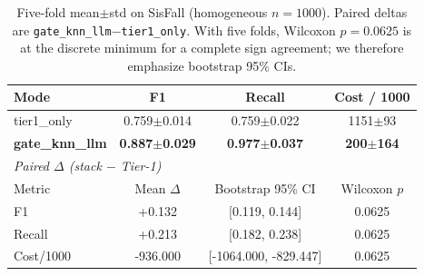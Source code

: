 \begin{table}[!t]
\centering
\caption{Five-fold mean$\pm$std on SisFall (homogeneous $n{=}1000$). Paired deltas are \texttt{gate\_knn\_llm}$-$\texttt{tier1\_only}. With five folds, Wilcoxon $p{=}0.0625$ is at the discrete minimum for a complete sign agreement; we therefore emphasize bootstrap 95\% CIs.}
\label{tab:meanstd}
\begin{tabular}{lccc}
\toprule
Mode & F1 & Recall & Cost / 1000 \\
\midrule
tier1\_only & 0.759$\pm$0.014 & 0.759$\pm$0.022 & 1151$\pm$93 \\
\textbf{gate\_knn\_llm} & \textbf{0.887$\pm$0.029} & \textbf{0.977$\pm$0.037} & \textbf{200$\pm$164} \\
\midrule
\multicolumn{4}{l}{\textit{Paired $\Delta$ (stack $-$ Tier-1)}} \\
Metric & Mean $\Delta$ & Bootstrap 95\% CI & Wilcoxon $p$ \\
\midrule
F1 & +0.132 & [0.119, 0.144] & 0.0625 \\
Recall & +0.213 & [0.182, 0.238] & 0.0625 \\
Cost/1000 & -936.000 & [-1064.000, -829.447] & 0.0625 \\
\bottomrule
\end{tabular}
\end{table}
